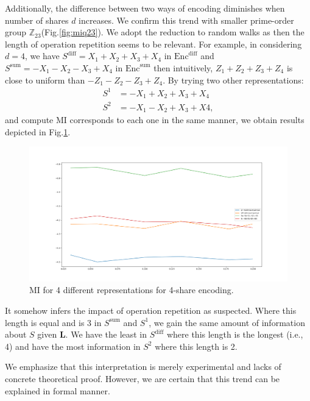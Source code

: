 \documentclass{llncs}
\begin{document}
Additionally, the difference between two ways of encoding diminishes when number of shares $d$ increases. We confirm this trend with smaller prime-order group $\mathbb{Z}_{23}$(Fig.\ref{fig:miq23}). We adopt the reduction to random walks as \cite{optimalmask} then the length of operation repetition seems to be relevant. For example, in considering $d=4$, we have $S^\text{diff} = X_1 + X_2 + X_3 + X_4$ in $\text{Enc}^{\text{diff}}$  and $S^\text{sum} = -X_1 - X_2 - X_3 + X_4$   in $\text{Enc}^{\text{sum}}$ then intuitively, $Z_1 + Z_2 + Z_3 + Z_4$ is close to uniform than $-Z_1 - Z_2 - Z_3 + Z_4$. By trying two other representations:
\begin{align*}
	S^1 &= -X_1 + X_2 + X_3 + X_4\\
	S^2 &= -X_1 - X_2 + X_3 + X4,
\end{align*}
and compute MI corresponds to each one in the same manner, we obtain results depicted in Fig.\ref{fig:mi_4shares}.
\begin{figure}[h]
	\vspace*{-0.0cm}
	\hspace*{0.0cm}\centering \includegraphics[scale=0.2]{figures/4shares_modes.png}
	\vspace*{0.3cm}
	\caption{MI for 4 different representations for 4-share encoding.}\label{fig:mi_4shares}\vspace*{-0.0cm}
\end{figure}

It somehow infers the impact of operation repetition as suspected. Where this length is equal and is 3 in $S^\text{sum}$ and $S^1 $, we gain the same amount of information about $S$ given $\bm{L}$. We have the least in $S^\text{diff}$ where this length is the longest (i.e., 4) and have the most information in $S^2$ where this length is 2.

We emphasize that this interpretation is merely experimental and lacks of concrete theoretical proof. However, we are certain that this trend can be explained in formal manner.
\end{document}
